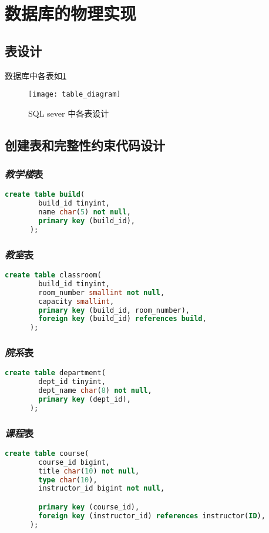 \documentclass{myreport}
\begin{document}
\section{数据库的物理实现}
  \subsection{表设计}
    数据库中各表如\cref{fig:table_diagram}
    \begin{figure}[H]
      \centering
      \texttt{[image: table\_diagram]}
      \caption{SQL sever 中各表设计}
      \label{fig:table_diagram}
    \end{figure}

  \subsection{创建表和完整性约束代码设计}
    \subsubsection{\emph{教学楼}表}
    \begin{lstlisting}[language=sql]
      create table build(
        build_id tinyint,
        name char(5) not null,
        primary key (build_id),
      );
    \end{lstlisting}

    \subsubsection{\emph{教室}表}
    \begin{lstlisting}[language=sql]
      create table classroom(
        build_id tinyint,
        room_number smallint not null,
        capacity smallint,
        primary key (build_id, room_number),
        foreign key (build_id) references build,
      );
    \end{lstlisting}

    \subsubsection{\emph{院系}表}
    \begin{lstlisting}[language=sql]
      create table department(
        dept_id tinyint,
        dept_name char(8) not null,
        primary key (dept_id),
      );
    \end{lstlisting}

    \subsubsection{\emph{课程}表}
    \begin{lstlisting}[language=sql]
      create table course(
        course_id bigint,
        title char(10) not null,
        type char(10),
        instructor_id bigint not null,

        primary key (course_id),
        foreign key (instructor_id) references instructor(ID),
      );
    \end{lstlisting}
\end{document}
